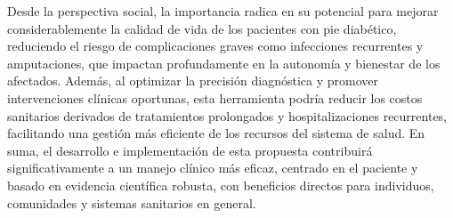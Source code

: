 Desde la perspectiva social, la importancia radica en su potencial para mejorar considerablemente la calidad de vida de los pacientes con pie diabético, reduciendo el riesgo de complicaciones graves como infecciones recurrentes y amputaciones, que impactan profundamente en la autonomía y bienestar de los afectados. Además, al optimizar la precisión diagnóstica y promover intervenciones clínicas oportunas, esta herramienta podría reducir los costos sanitarios derivados de tratamientos prolongados y hospitalizaciones recurrentes, facilitando una gestión más eficiente de los recursos del sistema de salud. En suma, el desarrollo e implementación de esta propuesta contribuirá significativamente a un manejo clínico más eficaz, centrado en el paciente y basado en evidencia científica robusta, con beneficios directos para individuos, comunidades y sistemas sanitarios en general.





